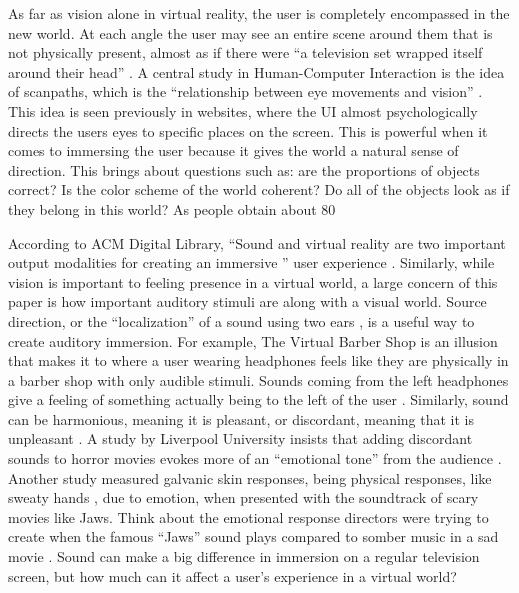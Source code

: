 \documentclass[manuscript,screen,review]{acmart}
\begin{document}
As far as vision alone in virtual reality, the user is completely encompassed in the new world. At each angle the user may see an entire scene around them that is not physically present, almost as if there were “a television set wrapped itself around their head” \cite{BIOCCA}. A central study in Human-Computer Interaction is the idea of scanpaths, which is the “relationship between eye movements and vision” \cite{HAASS}. This idea is seen previously in websites, where the UI almost psychologically directs the users eyes to specific places on the screen. This is powerful when it comes to immersing the user because it gives the world a natural sense of direction. This brings about questions such as: are the proportions of objects correct? Is the color scheme of the world coherent? Do all of the objects look as if they belong in this world? As people obtain about 80%

According to ACM Digital Library, “Sound and virtual reality are two important output modalities for creating an immersive '' user experience \cite{ROGERS}. Similarly, while vision is important to feeling presence in a virtual world, a large concern of this paper is how important auditory stimuli are along with a visual world. Source direction, or the “localization” of a sound using two ears \cite{DIETZ}, is a useful way to create auditory immersion. For example, The Virtual Barber Shop is an illusion that makes it to where a user wearing headphones feels like they are physically in a barber shop with only audible stimuli. Sounds coming from the left headphones give a feeling of something actually being to the left of the user \cite{LOVELYVIRUS}. Similarly, sound can be harmonious, meaning it is pleasant, or discordant, meaning that it is unpleasant \cite{MACKENZIE}.  A study by Liverpool University insists that adding discordant sounds to horror movies evokes more of an “emotional tone” from the audience \cite{REDFERN}. Another study measured galvanic skin responses, being physical responses, like sweaty hands , due to emotion, when presented with the soundtrack of scary movies like Jaws. Think about the emotional response directors were trying to create when the famous “Jaws'' sound plays compared to somber music in a sad movie \cite{WILLIAMS}. Sound can make a big difference in immersion on a regular television screen, but how much can it affect a user's experience in a virtual world?
\end{document}

